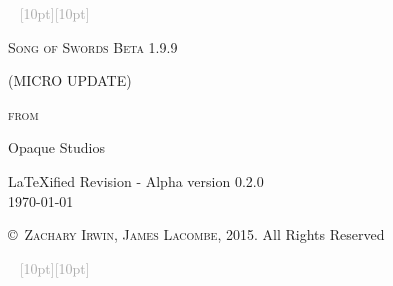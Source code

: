 \documentclass[oneside,11pt,english]{book}
\newcommand{\ornamento}{\vspace{2em}\noindent \textcolor{darkgray}{\hrulefill~ \raisebox{-2.5pt}[10pt][10pt]{\leafright \decofourleft \decothreeleft  \aldineright \decotwo \floweroneleft \decoone   \floweroneright \decotwo \aldineleft\decothreeright \decofourright \leafleft} ~  \hrulefill \linebreak \vspace{2em}}}
\begin{document}
\frontmatter

\begin{titlepage}
  \pagestyle{empty}
  \centering
  \ornamento\\
  {\scshape\huge Song of Swords Beta 1.9.9\par}
  \vspace{0.8cm}
  {\scshape\Large{(MICRO UPDATE)}\par \scshape\Large{from} \par}
  \vspace{0.1 cm}
  {\huge Opaque Studios \par}
  \vfill
  {\Large\LaTeX ified Revision - Alpha version 0.2.0\\ \today }\par
  \vspace{0.2 cm}
  \textsc{\copyright~Zachary Irwin, James Lacombe}, 2015. All Rights Reserved
  
  \ornamento
\end{titlepage}
\newpage
\end{document}

